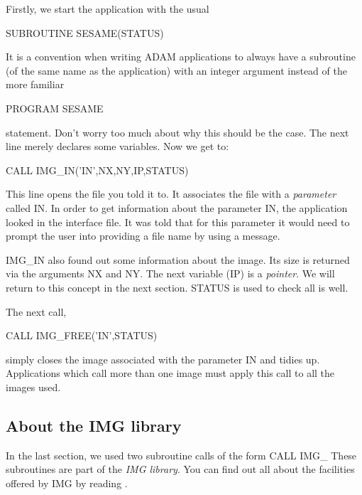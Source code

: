 \documentclass[11pt,nolof]{starlink}
\begin{document}
Firstly, we start the application with the usual

\begin{terminalv}
SUBROUTINE SESAME(STATUS)
\end{terminalv}

It is a convention when writing ADAM applications to always have
a subroutine (of the same name as the application) with
an integer argument instead of the more familiar

\begin{terminalv}
PROGRAM SESAME
\end{terminalv}

statement. Don't worry too much about why this should be the case.
The next line merely declares some variables. Now
we get to:

\begin{terminalv}
CALL IMG_IN('IN',NX,NY,IP,STATUS)
\end{terminalv}

This line opens the file you told it to. It associates the file with a
\textit{parameter} called \textsf{IN}. In order to get information about the
parameter \textsf{IN}, the application looked in the interface file. It was
told that for this parameter it would need to prompt the user into
providing a file name by using a message.

\textsf{IMG\_IN} also found out some information about the image. Its size
is returned via the arguments \textsf{NX} and \textsf{NY}.  The next variable
(\textsf{IP}) is a \textit{pointer}. We will return to this concept in the next
section.  \textsf{STATUS} is used to check all is well.

The next call,

\begin{terminalv}
CALL IMG_FREE('IN',STATUS)
\end{terminalv}

simply closes the image associated with the parameter \textsf{IN} and tidies
up. Applications which call more than one image must apply this call to
all the images used.

\subsection{About the IMG library}

In the last section, we used two subroutine calls of the form \textsf{CALL
IMG\_} These subroutines are part of the \textit{IMG library}. You can find
out all about the facilities offered by IMG by reading
.
\end{document}
